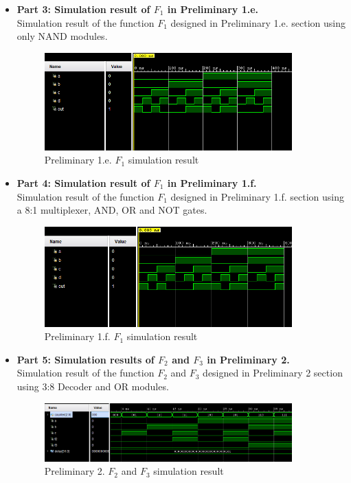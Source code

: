 \documentclass[pdftex,12pt,a4paper]{article}
\begin{document}
\newpage
\begin{itemize}
    \item \textbf{Part 3: Simulation result of $F_1$ in Preliminary 1.e.}\\
    Simulation result of the function $F_1$ designed in Preliminary 1.e. section using only NAND modules.
    \begin{figure}[H]
    \centering
        \includegraphics[width=0.9\textwidth]{1d.png}	
        \caption{Preliminary 1.e. $F_1$ simulation result}
        \label{fig1}
   \end{figure}
\end{itemize}
\begin{itemize}
    \item \textbf{Part 4: Simulation result of $F_1$ in Preliminary 1.f.}\\
    Simulation result of the function $F_1$ designed in Preliminary 1.f. section using a 8:1 multiplexer, AND, OR and NOT gates.
    \begin{figure}[H]
    \centering
        \includegraphics[width=0.9\textwidth]{1f.png}	
        \caption{Preliminary 1.f. $F_1$ simulation result}
        \label{fig1}
   \end{figure}
\end{itemize}
\newpage
\begin{itemize}
    \item \textbf{Part 5: Simulation results of $F_2$ and $F_3$ in Preliminary 2.}\\
    Simulation result of the function $F_2$ and $F_3$ designed in Preliminary 2 section using 3:8 Decoder and OR modules.
    \begin{figure}[H]
    \centering
        \includegraphics[width=0.9\textwidth]{part5.png}	
        \caption{Preliminary 2. $F_2$ and $F_3$ simulation result}
        \label{fig1}
   \end{figure}
\end{itemize}
\end{document}
